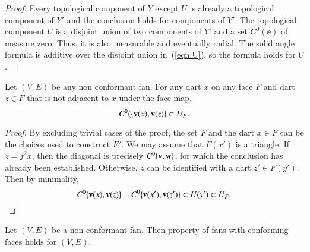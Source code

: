 \begin{proof} Every topological component of $Y$ 
except $U$ is already a topological component of $Y'$ and the conclusion
holds for components of $Y'$.  The topological component $U$ is a disjoint union of two
components of $Y'$ and a set $C^0(\ee)$ of measure zero.  Thus, it
is also measurable and eventually radial.  The solid angle formula is
additive over the disjoint union in~(\ref{eqn:U}), so the formula holds for $U$.
\end{proof}
%


\begin{lemma}  Let $(V,E)$ be any non conformant fan.  For any dart $x$ on any face $F$ and dart $z\in F$ that is not adjacent to $x$ under the face map, 
$$
C^0(\{{\mathbf v}(x),{\mathbf v}(z)\} \subset U_F.
$$
\end{lemma}

\begin{proof}  By excluding trivial cases of the proof,  the set $F$ and the dart $x\in F$ can be the choices used to construct $E'$.
We may assume that $F(x')$ is a triangle.
If $z=f^2x$, then the diagonal is precisely $C^0\{{\mathbf v},{\mathbf w}\}$,
for which the conclusion has already been established.  Otherwise, $z$ can be identified with
a dart $z'\in F(y')$.  Then by minimality,
$$
C^0\{{\mathbf v}(x),{\mathbf v}(z)\} = C^0\{{\mathbf v}(x'),{\mathbf v}(z')\} \subset U(y') \subset U_F.
$$
\end{proof}


\begin{lemma}   Let $(V,E)$ be a non conformant fan.  Then  property  of fans with conforming faces holds for $(V,E)$.
\end{lemma}
%

